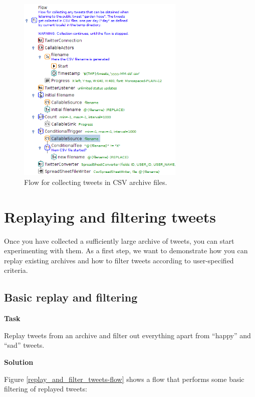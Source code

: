 \documentclass[a4paper,10pt]{book}
\newcommand{\heading}[1]{
  \vspace{0.3cm} \noindent \textbf{#1} \newline
}
\begin{document}
\begin{figure}[htb]
  \centering
  \includegraphics[width=8.0cm]{images/collect_tweets-flow.png}
  \caption{Flow for collecting tweets in CSV archive files.}
  \label{collect_tweets-flow}
\end{figure}

\clearpage
\newpage
\section{Replaying and filtering tweets}
Once you have collected a sufficiently large archive of tweets, you can start experimenting with them. As a first step, we want to demonstrate how you can replay existing archives and how to filter tweets according to user-specified criteria.

\subsection{Basic replay and filtering}

\heading{Task}
Replay tweets from an archive and filter out everything apart from ``happy'' and ``sad'' tweets.

\heading{Solution}
Figure \ref{replay_and_filter_tweets-flow} shows a flow that performs some basic filtering of replayed tweets:
\end{document}
